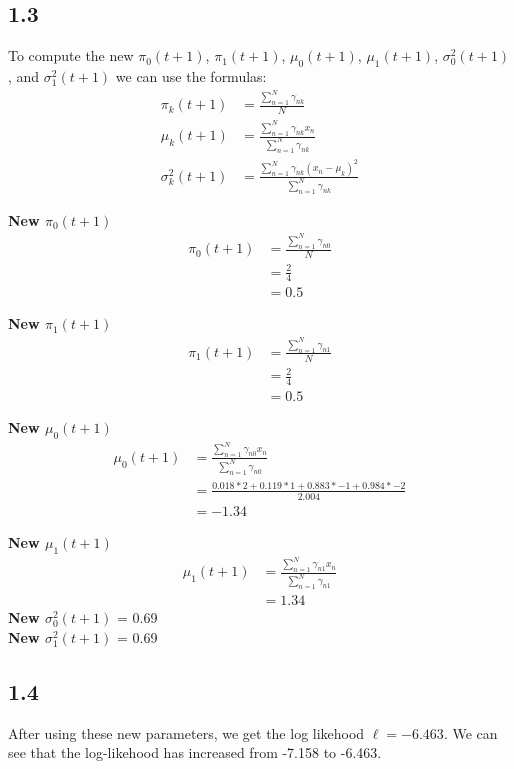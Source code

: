 \documentclass{article}
\begin{document}
\subsection*{1.3}
To compute the new $\pi_0(t+1)$, $\pi_1(t+1)$, $\mu_0(t+1)$, $\mu_1(t+1)$, $\sigma_0^2(t+1)$, and $\sigma_1^2(t+1)$ we can use the formulas:
\begin{align*}
    \pi_k(t+1) &= \frac{\sum_{n=1}^{N}\gamma_{nk}}{N}\\
    \mu_k(t+1) &= \frac{\sum_{n=1}^{N}\gamma_{nk}x_n}{\sum_{n=1}^{N}\gamma_{nk}}\\
    \sigma_k^2(t+1) &= \frac{\sum_{n=1}^{N}\gamma_{nk}(x_n - \mu_k)^2}{\sum_{n=1}^{N}\gamma_{nk}}
\end{align*}

\textbf{New $\pi_0(t+1)$}
\begin{align*}
    \pi_0(t+1) &= \frac{\sum_{n=1}^{N}\gamma_{n0}}{N}\\
    &= \frac{2}{4}\\
    &= 0.5
\end{align*}

\textbf{New $\pi_1(t+1)$}
\begin{align*}
    \pi_1(t+1) &= \frac{\sum_{n=1}^{N}\gamma_{n1}}{N}\\
    &= \frac{2}{4}\\
    &= 0.5
\end{align*}

\textbf{New $\mu_0(t+1)$}
\begin{align*}
    \mu_0(t+1) &= \frac{\sum_{n=1}^{N}\gamma_{n0}x_n}{\sum_{n=1}^{N}\gamma_{n0}}\\
    &= \frac{0.018*2+0.119*1+0.883*-1+0.984*-2}{2.004}\\
    &= -1.34
\end{align*}

\textbf{New $\mu_1(t+1)$}
\begin{align*}
    \mu_1(t+1) &= \frac{\sum_{n=1}^{N}\gamma_{n1}x_n}{\sum_{n=1}^{N}\gamma_{n1}}\\
    &= 1.34
\end{align*}
\textbf{New $\sigma_0^2(t+1)$} = 0.69\\
\textbf{New $\sigma_1^2(t+1)$} = 0.69

\subsection*{1.4}
After using these new parameters, we get the log likehood $\ell = -6.463$.
We can see that the log-likehood has increased from -7.158 to -6.463.
\end{document}
